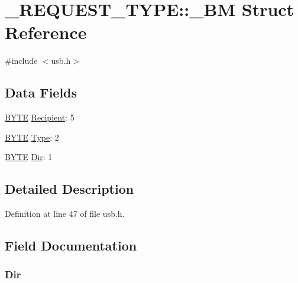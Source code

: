 \hypertarget{struct___r_e_q_u_e_s_t___t_y_p_e_1_1___b_m}{
\section{\_\-REQUEST\_\-TYPE::\_\-BM Struct Reference}
\label{struct___r_e_q_u_e_s_t___t_y_p_e_1_1___b_m}
}


{\ttfamily \#include $<$usb.h$>$}

\subsection*{Data Fields}
\begin{DoxyCompactItemize}
\item 
\hyperlink{type_8h_a4ae1dab0fb4b072a66584546209e7d58}{BYTE} \hyperlink{struct___r_e_q_u_e_s_t___t_y_p_e_1_1___b_m_aef3ec6aa3cef843da4d3125bddf87bcd}{Recipient}: 5
\item 
\hyperlink{type_8h_a4ae1dab0fb4b072a66584546209e7d58}{BYTE} \hyperlink{struct___r_e_q_u_e_s_t___t_y_p_e_1_1___b_m_a18377a6c26b74546712af8fc06de7205}{Type}: 2
\item 
\hyperlink{type_8h_a4ae1dab0fb4b072a66584546209e7d58}{BYTE} \hyperlink{struct___r_e_q_u_e_s_t___t_y_p_e_1_1___b_m_a3926b73729006874b8ea62c22a022b13}{Dir}: 1
\end{DoxyCompactItemize}


\subsection{Detailed Description}


Definition at line 47 of file usb.h.



\subsection{Field Documentation}
\hypertarget{struct___r_e_q_u_e_s_t___t_y_p_e_1_1___b_m_a3926b73729006874b8ea62c22a022b13}{
\subsubsection[{Dir}]{ {\bf Dir}}}
\label{struct___r_e_q_u_e_s_t___t_y_p_e_1_1___b_m_a3926b73729006874b8ea62c22a022b13}


